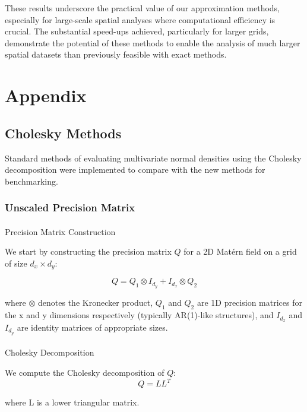 \documentclass[journal=,manuscript=]{achemso}
\makeatletter
\let\oldparagraph\paragraph
\renewcommand{\paragraph}{
    \@ifstar
      \xxxParagraphStar
      \xxxParagraphNoStar
  }
\newcommand{\xxxParagraphStar}[1]{\oldparagraph*{#1}\mbox{}}
\newcommand{\xxxParagraphNoStar}[1]{\oldparagraph{#1}\mbox{}}
\makeatother
\begin{document}
These results underscore the practical value of our approximation
methods, especially for large-scale spatial analyses where computational
efficiency is crucial. The substantial speed-ups achieved, particularly
for larger grids, demonstrate the potential of these methods to enable
the analysis of much larger spatial datasets than previously feasible
with exact methods.

\section{Appendix}\label{appendix}

\subsection{Cholesky Methods}\label{cholesky-methods}

Standard methods of evaluating multivariate normal densities using the
Cholesky decomposition were implemented to compare with the new methods
for benchmarking.

\subsubsection{Unscaled Precision
Matrix}\label{unscaled-precision-matrix}

\paragraph{Precision Matrix
Construction}\label{precision-matrix-construction}

We start by constructing the precision matrix \(Q\) for a 2D Matérn
field on a grid of size \(d_x \times d_y\):

\[
Q = Q_1 \otimes I_{d_y} + I_{d_x} \otimes Q_2 
\]

where \(\otimes\) denotes the Kronecker product, \(Q_1\) and \(Q_2\) are
1D precision matrices for the x and y dimensions respectively (typically
AR(1)-like structures), and \(I_{d_x}\) and \(I_{d_y}\) are identity
matrices of appropriate sizes.

\paragraph{Cholesky Decomposition}\label{cholesky-decomposition}

We compute the Cholesky decomposition of \(Q\): \[
Q = LL^T
\]

where L is a lower triangular matrix.
\end{document}
